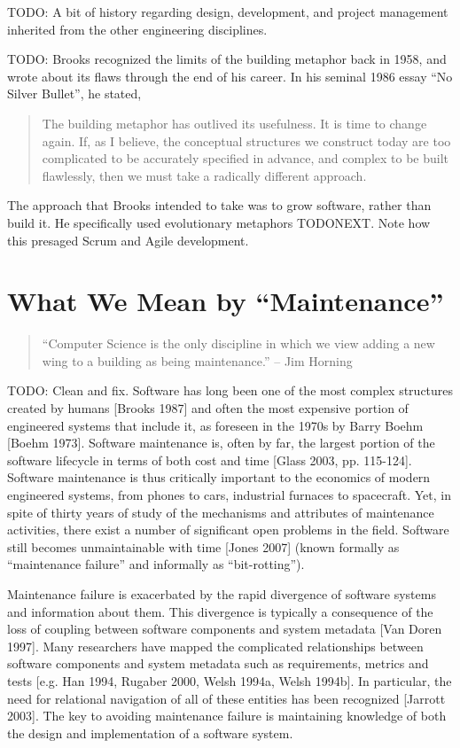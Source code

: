 TODO: A bit of history regarding design, development, and project management inherited from the other engineering disciplines.

TODO: Brooks recognized the limits of the building metaphor back in 1958, and wrote about its flaws through the end of his career. In his seminal 1986 essay ``No Silver Bullet'', he stated,

\begin{quotation}
The building metaphor has outlived its usefulness. It is time to change again. If, as I believe, the conceptual structures we construct today are too complicated to be accurately specified in advance, and complex to be built flawlessly, then we must take a radically different approach.
\end{quotation}

The approach that Brooks intended to take was to grow software, rather than build it. He specifically used evolutionary metaphors TODONEXT. Note how this presaged Scrum and Agile development.


\section{What We Mean by ``Maintenance''}

\begin{quote}
``Computer Science is the only discipline
in which we view adding a new wing to a building as being maintenance.'' -- Jim Horning
\end{quote}

TODO: Clean and fix.
Software has long been one of the most complex structures created by humans [Brooks 1987] and often the most expensive portion of engineered systems that include it, as foreseen in the 1970s by Barry Boehm [Boehm 1973]. Software maintenance is, often by far, the largest portion of the software lifecycle in terms of both cost and time [Glass 2003, pp. 115-124]. Software maintenance is thus critically important to the economics of modern engineered systems, from phones to cars, industrial furnaces to spacecraft. Yet, in spite of thirty years of study of the mechanisms and attributes of maintenance activities, there exist a number of significant open problems in the field. Software still becomes unmaintainable with time [Jones 2007] (known formally as ``maintenance failure'' and informally as ``bit-rotting'').

Maintenance failure is exacerbated by the rapid divergence of software systems and information about them. This divergence is typically a consequence of the loss of coupling between software components and system metadata [Van Doren 1997]. Many researchers have mapped the complicated relationships between software components and system metadata such as requirements, metrics and tests [e.g. Han 1994, Rugaber 2000, Welsh 1994a, Welsh 1994b]. In particular, the need for relational navigation of all of these entities has been recognized [Jarrott 2003]. The key to avoiding maintenance failure is maintaining knowledge of both the design and implementation of a software system.


